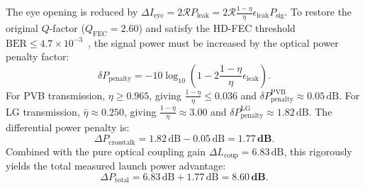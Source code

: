\documentclass{optica-article}
\begin{document}
The eye opening is reduced by $\Delta I_{\text{eye}} = 2 \mathcal{R} P_{\text{leak}} = 2 \mathcal{R} \frac{1 - \eta}{\eta} \epsilon_{\text{leak}} P_{\text{sig}}$. To restore the original $Q$-factor ($Q_{\text{FEC}} = 2.60$) and satisfy the HD-FEC threshold $\text{BER} \le 4.7 \times 10^{-3}$~\cite{ITUTG9751,Proakis2008}, the signal power must be increased by the optical power penalty factor:
\begin{equation}
\delta P_{\text{penalty}} = -10 \log_{10}\left( 1 - 2 \frac{1 - \eta}{\eta} \epsilon_{\text{leak}} \right).
\label{eq:app_eye_penalty}
\end{equation}
For PVB transmission, $\eta \ge 0.965$, giving $\frac{1 - \eta}{\eta} \le 0.036$ and $\delta P_{\text{penalty}}^{\text{PVB}} \approx 0.05\,\text{dB}$.
For LG transmission, $\bar{\eta} \approx 0.250$, giving $\frac{1 - \eta}{\eta} \approx 3.00$ and $\delta P_{\text{penalty}}^{\text{LG}} \approx 1.82\,\text{dB}$.
The differential power penalty is:
\begin{equation}
\Delta P_{\text{crosstalk}} = 1.82\,\text{dB} - 0.05\,\text{dB} = \mathbf{1.77\,\text{dB}}.
\label{eq:app_crosstalk_final}
\end{equation}
Combined with the pure optical coupling gain $\Delta L_{\text{coup}} = 6.83\,\text{dB}$, this rigorously yields the total measured launch power advantage:
\begin{equation}
\boxed{\Delta P_{\text{total}} = 6.83\,\text{dB} + 1.77\,\text{dB} = \mathbf{8.60\,\text{dB}}.}
\label{eq:app_total_860db}
\end{equation}
\end{document}
